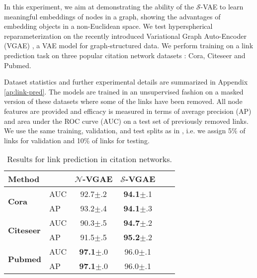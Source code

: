 \documentclass[letterpaper]{article}
\newcommand{\Sv}{$\mathcal{S}$}
\newcommand{\Nv}{$\mathcal{N}$}
\begin{document}
In this experiment, we aim at demonstrating the ability of the \Sv-VAE to learn meaningful embeddings of nodes in a graph, showing the advantages of embedding objects in a non-Euclidean space. We test hyperspherical reparameterization on the recently introduced Variational Graph Auto-Encoder (VGAE) \citep{kipf2016VGAE}, a VAE model for graph-structured data. We perform training on a link prediction task on three popular citation network datasets \citep{sen2008collective}: Cora, Citeseer and Pubmed.

Dataset statistics and further experimental details are summarized in Appendix \ref{ap:link-pred}. The models are trained in an unsupervised fashion on a masked version of these datasets where some of the links have been removed. All node features are provided and efficacy is measured in terms of average precision (AP) and area under the ROC curve (AUC) on a test set of previously removed links. We use the same training, validation, and test splits as in \cite{kipf2016VGAE}, i.e. we assign 5\% of links for validation and 10\% of links for testing.


\begin{table}[H]
  \centering
    \caption{Results for link prediction in citation networks.}
    \bigskip
    \begin{tabular}{ll|cccc}
    \toprule
      \textbf{Method}  &  & \textbf{\Nv-VGAE} & \textbf{\Sv-VGAE} \\
    \midrule
        \multirow{2}{*}{\textbf{Cora}} & AUC & 92.7{\tiny$\pm$.2} & \textbf{94.1}{\tiny$\pm$.1} \\
        & AP &  93.2{\tiny$\pm$.4} & \textbf{94.1}{\tiny$\pm$.3} \\
    \midrule
        \multirow{2}{*}{\textbf{Citeseer}}& AUC & 90.3{\tiny$\pm$.5} & \textbf{94.7}{\tiny$\pm$.2} \\
        & AP & 91.5{\tiny$\pm$.5} & \textbf{95.2}{\tiny$\pm$.2} \\
    \midrule
    \multirow{2}{*}{\textbf{Pubmed}}& AUC & \textbf{97.1}{\tiny$\pm$.0} & 96.0{\tiny$\pm$.1} \\
    & AP & \textbf{97.1}{\tiny$\pm$.0} & 96.0{\tiny$\pm$.1} \\
    \bottomrule
    \end{tabular}
  \label{tab:graph}
\end{table}
\end{document}
